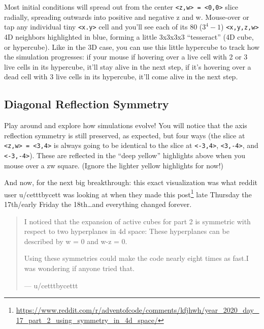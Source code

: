 \documentclass[]{article}
\renewcommand{\href}[2]{#2\footnote{\url{#1}}}
\begin{document}
Most initial conditions will spread out from the center
\texttt{\textless{}z,w\textgreater{}\ =\ \textless{}0,0\textgreater{}} slice
radially, spreading outwards into positive and negative z and w. Mouse-over or
tap any individual tiny \texttt{\textless{}x.y\textgreater{}} cell and you'll
see each of its 80 (\(3^4-1\)) \texttt{\textless{}x,y,z,w\textgreater{}} 4D
neighbors highlighted in blue, forming a little 3x3x3x3 ``tesseract'' (4D cube,
or hypercube). Like in the 3D case, you can use this little hypercube to track
how the simulation progresses: if your mouse if hovering over a live cell with 2
or 3 live cells in its hypercube, it'll stay alive in the next step, if it's
hovering over a dead cell with 3 live cells in its hypercube, it'll come alive
in the next step.

\hypertarget{diagonal-reflection-symmetry}{%
\subsection{Diagonal Reflection Symmetry}\label{diagonal-reflection-symmetry}}

Play around and explore how simulations evolve! You will notice that the axis
reflection symmetry is still preserved, as expected, but four ways (the slice at
\texttt{\textless{}z,w\textgreater{}\ =\ \textless{}3,4\textgreater{}} is always
going to be identical to the slice at \texttt{\textless{}-3,4\textgreater{}},
\texttt{\textless{}3,-4\textgreater{}}, and
\texttt{\textless{}-3,-4\textgreater{}}). These are reflected in the ``deep
yellow'' highlights above when you mouse over a zw square. (Ignore the lighter
yellow highlights for now!)

And now, for the next big breakthrough: this exact visualization was what reddit
user u/cetttbycett was looking at when
\href{https://www.reddit.com/r/adventofcode/comments/kfjhwh/year_2020_day_17_part_2_using_symmetry_in_4d_space/}{they
made this post} late Thursday the 17th/early Friday the 18th\ldots and
everything changed forever.

\begin{quote}
I noticed that the expansion of active cubes for part 2 is symmetric with
respect to two hyperplanes in 4d space: These hyperplanes can be described by w
= 0 and w-z = 0.

Using these symmetries could make the code nearly eight times as fast.I was
wondering if anyone tried that.

--- u/cetttbycettt
\end{quote}
\end{document}
